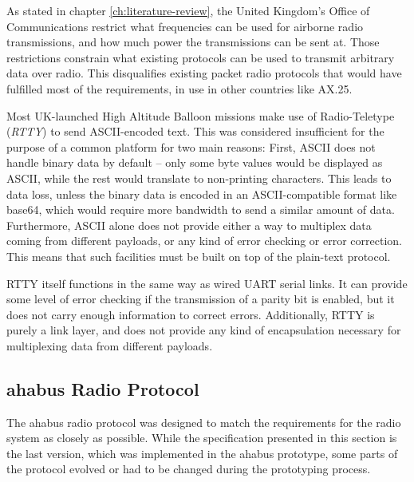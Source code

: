 As stated in chapter \ref{ch:literature-review}, the United Kingdom's Office
of Communications restrict what frequencies can be used for airborne
radio transmissions, and how much power the transmissions can be sent at.
Those restrictions constrain what existing protocols can be used to transmit
arbitrary data over radio. This disqualifies existing packet radio protocols
that would have fulfilled most of the requirements, in use in other countries
like AX.25.

Most UK-launched High Altitude Balloon missions make use of Radio-Teletype
(\textit{RTTY}) to send ASCII-encoded text. This was considered insufficient
for the purpose of a common platform for two main reasons: First, ASCII does
not handle binary data by default -- only some byte values would be displayed
as ASCII, while the rest would translate to non-printing characters. This leads
to data loss, unless the binary data is encoded in an ASCII-compatible format
like base64, which would require more bandwidth to send a similar amount of
data. Furthermore, ASCII alone does not provide either a way to multiplex data
coming from different payloads, or any kind of error checking or error
correction. This means that such facilities must be built on top of the
plain-text protocol.

RTTY itself functions in the same way as wired UART serial links. It can provide
some level of error checking if the transmission of a parity bit is enabled, but
it does not carry enough information to correct errors. Additionally, RTTY is
purely a link layer, and does not provide any kind of encapsulation necessary
for multiplexing data from different payloads.
%
%

\subsection{\acrshort{ahabus} Radio Protocol}

The \acrshort{ahabus} radio protocol was designed to match the requirements for the radio
system as closely as possible. While the specification presented in this section
is the last version, which was implemented in the \acrshort{ahabus} prototype, some parts
of the protocol evolved or had to be changed during the prototyping process.

